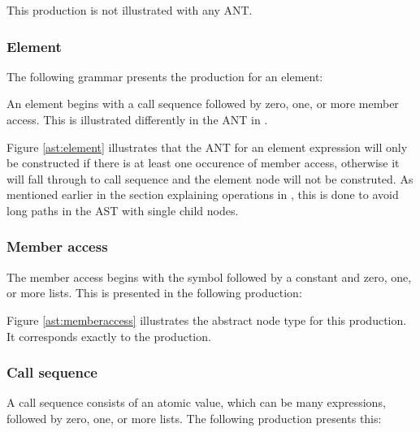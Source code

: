 This production is not illustrated with any ANT.

\subsubsection{Element}

The following grammar presents the production for an element:

\begin{ebnf}
\end{ebnf}

An element begins with a call sequence followed by zero, one, or more member
access. This is illustrated differently in the ANT in .



Figure \ref{ast:element} illustrates that the ANT for an element expression will
only be constructed if there is at least one occurence of member access,
otherwise it will fall through to call sequence and the element node will not be
construted. As mentioned earlier in the section explaining operations in
\productname{}, this is done to avoid long paths in the AST with single child
nodes.

\subsubsection{Member access}

The member access begins with the  symbol followed by a constant and
zero, one, or more lists. This is presented in the following production:

\begin{ebnf}
\end{ebnf}

Figure \ref{ast:memberaccess} illustrates the abstract node type for this
production. It corresponds exactly to the production.



\subsubsection{Call sequence}

A call sequence consists of an atomic value, which can be many expressions,
followed by zero, one, or more lists. The following production presents this:

